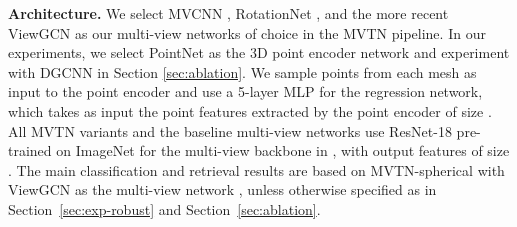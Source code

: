 \documentclass[10pt,twocolumn,letterpaper]{article}
\newcommand{\secLabel}{Section~}
\newcommand{\mysection}[1]{\noindent\textbf{#1.}}
\begin{document}
\begin{table}[t]
\tabcolsep=0.07cm
    \centering
{}
\vspace{2pt}
    \caption{\textbf{3D Shape Retrieval}. We benchmark the shape retrieval mAP of  MVTN on ModelNet40 \cite{modelnet} and ShapeNet Core55 \cite{shapenet,shrek17}. MVTN achieves the best retrieval performance among recent state-of-the-art methods on both datasets with only 12 views.}
     \label{tab:retrieval}
\end{table}

\mysection{Architecture}
We select MVCNN \cite{mvcnn}, RotationNet \cite{mvrotationnet}, and the more recent ViewGCN \cite{mvviewgcn} as our multi-view networks of choice in the MVTN pipeline.
In our experiments, we select PointNet \cite{pointnet} as the 3D point encoder network  and experiment with DGCNN in Section \ref{sec:ablation}.
We sample  points from each mesh as input to the point encoder and use a 5-layer MLP for the regression network, which takes as input the point features extracted by the point encoder of size .
All MVTN variants and the baseline multi-view networks use ResNet-18 \cite{resnet} pre-trained on ImageNet \cite{IMAGENET} for the multi-view backbone in , with output features of size . The main classification and retrieval results are based on MVTN-spherical with ViewGCN \cite{mvviewgcn} as the multi-view network , unless otherwise specified as in \secLabel{\ref{sec:exp-robust}} and \secLabel{\ref{sec:ablation}}. 
\end{document}
